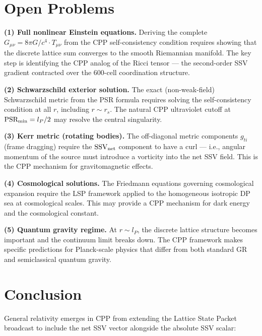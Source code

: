 \documentclass[12pt]{article}
\newcommand{\lP}{l_P}
\newcommand{\SSV}{\text{SSV}}
\newcommand{\PSR}{\text{PSR}}
\newcommand{\Gmn}{G_{\mu\nu}}
\newcommand{\Tmn}{T_{\mu\nu}}
\begin{document}
\section{Open Problems}
\label{sec:open}

\textbf{(1) Full nonlinear Einstein equations.}  Deriving the complete
$\Gmn = 8\pi G/c^4\cdot\Tmn$ from the CPP self-consistency condition
requires showing that the discrete lattice sum converges to the smooth
Riemannian manifold.  The key step is identifying the CPP analog of the
Ricci tensor --- the second-order SSV gradient contracted over the
600-cell coordination structure.

\textbf{(2) Schwarzschild exterior solution.}  The exact (non-weak-field)
Schwarzschild metric from the PSR formula requires solving the
self-consistency condition at all $r$, including $r \sim r_s$.  The
natural CPP ultraviolet cutoff at $\PSR_{\rm min} = \lP/2$ may resolve
the central singularity.

\textbf{(3) Kerr metric (rotating bodies).}  The off-diagonal metric
components $g_{ti}$ (frame dragging) require the $\mathbf{\SSV}_{\rm net}$
component to have a curl --- i.e., angular momentum of the source must
introduce a vorticity into the net SSV field.  This is the CPP mechanism
for gravitomagnetic effects.

\textbf{(4) Cosmological solutions.}  The Friedmann equations governing
cosmological expansion require the LSP framework applied to the homogeneous
isotropic DP sea at cosmological scales.  This may provide a CPP mechanism
for dark energy and the cosmological constant.

\textbf{(5) Quantum gravity regime.}  At $r \sim \lP$, the discrete
lattice structure becomes important and the continuum limit breaks down.
The CPP framework makes specific predictions for Planck-scale physics that
differ from both standard GR and semiclassical quantum gravity.

\section{Conclusion}
\label{sec:conclusion}

General relativity emerges in CPP from extending the Lattice State Packet
broadcast to include the net SSV vector alongside the absolute SSV scalar:
\end{document}
